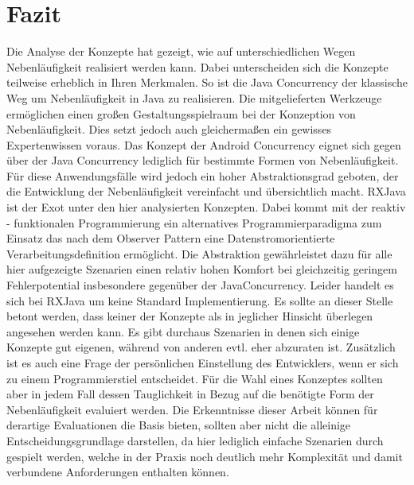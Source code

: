 \documentclass[12pt,oneside,a4paper,bibtotoc,liststotoc]{scrreprt}
\begin{document}
\section{Fazit}
Die Analyse der Konzepte hat gezeigt, wie auf unterschiedlichen Wegen Nebenläufigkeit realisiert werden kann. Dabei unterscheiden sich die Konzepte teilweise erheblich in Ihren Merkmalen. So ist die Java Concurrency der klassische Weg um Nebenläufigkeit in Java zu realisieren. Die mitgelieferten Werkzeuge ermöglichen einen großen Gestaltungsspielraum bei der Konzeption von Nebenläufigkeit. Dies setzt jedoch auch gleichermaßen ein gewisses Expertenwissen voraus. Das Konzept der Android Concurrency eignet sich gegen über der Java Concurrency lediglich für bestimmte Formen von Nebenläufigkeit. Für diese Anwendungsfälle wird jedoch ein hoher Abstraktionsgrad geboten, der die Entwicklung der Nebenläufigkeit vereinfacht und übersichtlich macht. RXJava ist der Exot unter den hier analysierten Konzepten. Dabei kommt mit der reaktiv - funktionalen Programmierung ein alternatives Programmierparadigma zum Einsatz das nach dem Observer Pattern eine Datenstromorientierte Verarbeitungsdefinition ermöglicht. Die Abstraktion gewährleistet dazu für alle hier aufgezeigte Szenarien einen relativ hohen Komfort bei gleichzeitig geringem Fehlerpotential insbesondere gegenüber der JavaConcurrency. Leider handelt es sich bei RXJava um keine Standard Implementierung.\newline
Es sollte an dieser Stelle betont werden, dass keiner der Konzepte als in jeglicher Hinsicht überlegen angesehen werden kann. Es gibt durchaus Szenarien in denen sich einige Konzepte gut eigenen, während von anderen evtl. eher abzuraten ist. Zusätzlich ist es auch eine Frage der persönlichen Einstellung des Entwicklers, wenn er sich zu einem Programmierstiel entscheidet. Für die Wahl eines Konzeptes sollten aber in jedem Fall dessen Tauglichkeit in Bezug auf die benötigte Form der Nebenläufigkeit evaluiert werden. Die Erkenntnisse dieser Arbeit können für derartige Evaluationen die Basis bieten, sollten aber nicht die alleinige Entscheidungsgrundlage darstellen, da hier lediglich einfache Szenarien durch gespielt werden, welche in der Praxis noch deutlich mehr Komplexität und damit verbundene Anforderungen enthalten können. 
\end{document}
